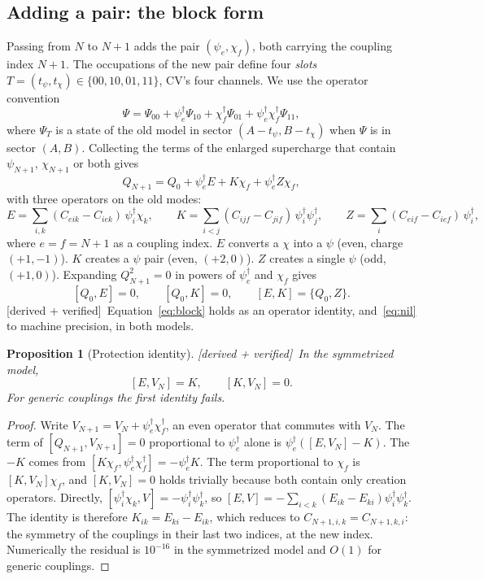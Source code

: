 \documentclass[11pt]{article}
\newcommand{\psie}{\psi_e}
\newcommand{\chif}{\chi_f}
\newcommand{\tagbox}[2]{\textsf{\small\color{#1}[#2]}}
\newcommand{\VER}{\tagbox{cder}{derived + verified}}
\theoremstyle{plain}
\newtheorem{proposition}{Proposition}
\theoremstyle{remark}
\numberwithin{equation}{section}
\begin{document}
\subsection{Adding a pair: the block form}

Passing from $N$ to $N+1$ adds the pair $(\psie,\chif)$, both carrying the coupling index $N+1$. The occupations of the
new pair define four \emph{slots} $T=(t_\psi,t_\chi)\in\{00,10,01,11\}$, CV's four channels. We use the operator
convention
\begin{equation}\label{eq:slots}
\Psi=\Psi_{00}+\psie^\dagger\Psi_{10}+\chif^\dagger\Psi_{01}+\psie^\dagger\chif^\dagger\Psi_{11},
\end{equation}
where $\Psi_T$ is a state of the old model in sector $(A-t_\psi,B-t_\chi)$ when $\Psi$ is in sector $(A,B)$. Collecting
the terms of the enlarged supercharge that contain $\psi_{N+1}$, $\chi_{N+1}$ or both gives
\begin{equation}\label{eq:block}
Q_{N+1}=Q_0+\psie^\dagger E+K\chif+\psie^\dagger Z\chif ,
\end{equation}
with three operators on the old modes:
\begin{equation}\label{eq:EKZ}
E=\sum_{i,k}(C_{e i k}-C_{i e k})\,\psi_i^\dagger\chi_k,\qquad
K=\sum_{i<j}(C_{ijf}-C_{jif})\,\psi_i^\dagger\psi_j^\dagger,\qquad
Z=\sum_i(C_{eif}-C_{ief})\,\psi_i^\dagger ,
\end{equation}
where $e=f=N+1$ as a coupling index. $E$ converts a $\chi$ into a $\psi$ (even, charge $(+1,-1)$). $K$ creates a
$\psi$ pair (even, $(+2,0)$). $Z$ creates a single $\psi$ (odd, $(+1,0)$). Expanding $Q_{N+1}^2=0$ in powers of $\psie^\dagger$
and $\chif$ gives
\begin{equation}\label{eq:nil}
[Q_0,E]=0,\qquad [Q_0,K]=0,\qquad [E,K]=\{Q_0,Z\}.
\end{equation}
\VER\ Equation~\eqref{eq:block} holds as an operator identity, and~\eqref{eq:nil} to machine precision, in both models.

\begin{proposition}[Protection identity]\label{prop:ward}\VER\
In the symmetrized model,
\begin{equation}\label{eq:ward}
[E,V_N]=K,\qquad [K,V_N]=0 .
\end{equation}
For generic couplings the first identity fails.
\end{proposition}
\begin{proof}
Write $V_{N+1}=V_N+\psie^\dagger\chif^\dagger$, an even operator that commutes with $V_N$. The term of
$[Q_{N+1},V_{N+1}]=0$ proportional to $\psie^\dagger$ alone is $\psie^\dagger([E,V_N]-K)$. The $-K$ comes from
$[K\chif,\psie^\dagger\chif^\dagger]=-\psie^\dagger K$. The term proportional to $\chif$ is $[K,V_N]\chif$, and
$[K,V_N]=0$ holds trivially because both contain only creation operators. Directly,
$[\psi_i^\dagger\chi_k,V]=-\psi_i^\dagger\psi_k^\dagger$, so $[E,V]=-\sum_{i<k}(E_{ik}-E_{ki})\psi_i^\dagger\psi_k^\dagger$.
The identity is therefore $K_{ik}=E_{ki}-E_{ik}$, which reduces to $C_{N+1,i,k}=C_{N+1,k,i}$: the symmetry of the
couplings in their last two indices, at the new index. Numerically the residual is $10^{-16}$ in the symmetrized model
and $O(1)$ for generic couplings.
\end{proof}
\end{document}
